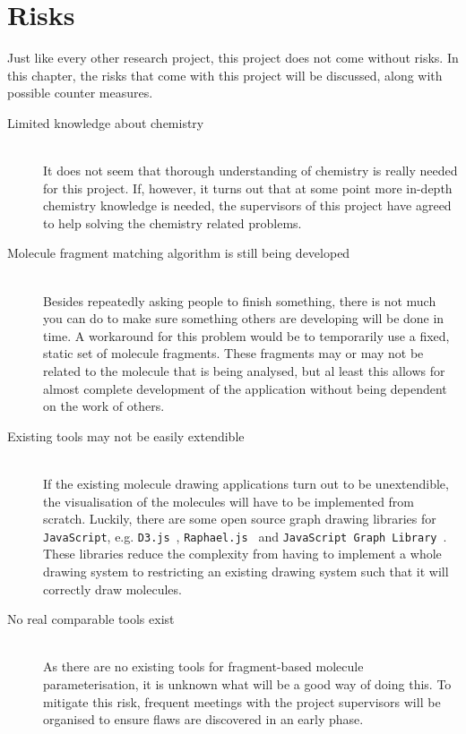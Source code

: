 \chapter{Risks}

Just like every other research project, this project does not come without risks. In this chapter, the risks that come with this project will be discussed, along with possible counter measures.

\begin{description}
\item[Limited knowledge about chemistry]~~\\
It does not seem that thorough understanding of chemistry is really needed for this project. If, however, it turns out that at some point more in-depth chemistry knowledge is needed, the supervisors of this project have agreed to help solving the chemistry related problems.

\item[Molecule fragment matching algorithm is still being developed]~~\\
Besides repeatedly asking people to finish something, there is not much you can do to make sure something others are developing will be done in time. A workaround for this problem would be to temporarily use a fixed, static set of molecule fragments. These fragments may or may not be related to the molecule that is being analysed, but al least this allows for almost complete development of the application without being dependent on the work of others.

\item[Existing tools may not be easily extendible]~~\\
If the existing molecule drawing applications turn out to be unextendible, the visualisation of the molecules will have to be implemented from scratch. Luckily, there are some open source graph drawing libraries for \verb|JavaScript|, e.g. \verb|D3.js|~\cite{bostock2012data}, \verb|Raphael.js|~\cite{baranovski2013raphael} and \verb|JavaScript Graph Library|~\cite{dracula2012javascript}. These libraries reduce the complexity from having to implement a whole drawing system to restricting an existing drawing system such that it will correctly draw molecules. 

\item[No real comparable tools exist]~~\\
As there are no existing tools for fragment-based molecule parameterisation, it is unknown what will be a good way of doing this. To mitigate this risk, frequent meetings with the project supervisors will be organised to ensure flaws are discovered in an early phase.


\end{description}
